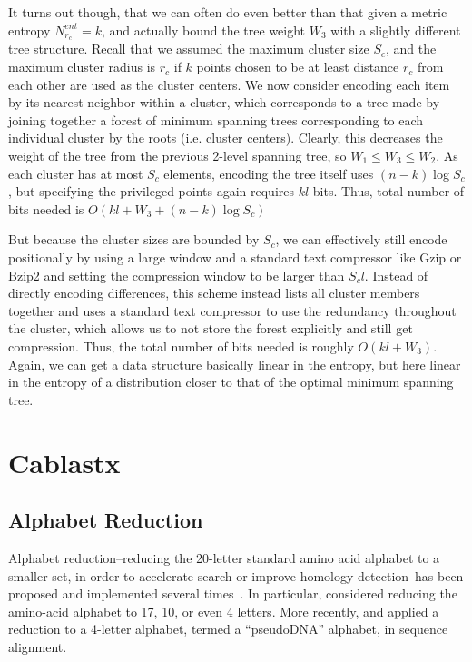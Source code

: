 \documentclass{amsbook}
\theoremstyle{definition}
\theoremstyle{remark}
\numberwithin{equation}{section}
\begin{document}
It turns out though, that we can often do even better than that given a metric entropy $N_{r_c}^{ent} = k$, and actually bound the tree weight $W_3$ with a slightly different tree structure.
Recall that we assumed the maximum cluster size $S_c$, and the maximum cluster radius is $r_c$ if $k$ points chosen to be at least distance $r_c$ from each other are used as the cluster centers.
We now consider encoding each item by its nearest neighbor within a cluster, which corresponds to a tree made by joining together a forest of minimum spanning trees corresponding to each individual cluster by the roots (i.e. cluster centers).
Clearly, this decreases the weight of the tree from the previous 2-level spanning tree, so $W_1 \le W_3 \le W_2$.
As each cluster has at most $S_c$ elements, encoding the tree itself uses $(n-k)\log S_c$, but specifying the privileged points again requires $kl$ bits.
Thus, total number of bits needed is $O(kl + W_3 + (n-k)\log S_c )$

But because the cluster sizes are bounded by $S_c$, we can effectively still encode positionally by using a large window and a standard text compressor like Gzip or Bzip2 and setting the compression window to be larger than $S_c l$.
Instead of directly encoding differences, this scheme instead lists all cluster members together and uses a standard text compressor to use the redundancy throughout the cluster, which allows us to not store the forest explicitly and still get compression.
Thus, the total number of bits needed is roughly $O(kl + W_3)$. Again, we can get a data structure basically linear in the entropy, but here linear in the entropy of a distribution closer to that of the optimal minimum spanning tree.

\section{Cablastx}

\subsection*{Alphabet Reduction}

Alphabet reduction--reducing the 20-letter standard amino acid alphabet to a
smaller set, in order to accelerate search or improve homology detection--has
been proposed and implemented several times~\cite{blah}.
In particular, \citet{Murphy:2000, Peterson:2009} considered reducing the
amino-acid alphabet to 17, 10, or even 4 letters.
More recently, \citet{Zhao:2012} and \citet{Huson:2013} applied a reduction to
a 4-letter alphabet, termed a ``pseudoDNA'' alphabet, in sequence alignment.
\end{document}
